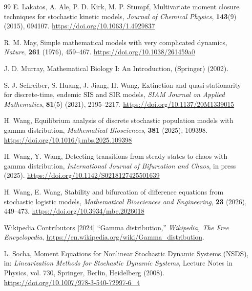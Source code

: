 \documentclass[12pt]{article}
\theoremstyle{definition}
\newcommand{\doilink}[1]{\href{#1}{#1}}
\begin{document}
\begin{thebibliography}{99}
\newblock E. Lakatos, A. Ale, P. D. Kirk, M. P. Stumpf,
\newblock Multivariate moment closure techniques for stochastic kinetic models,
\newblock \emph{Journal of Chemical Physics}, \textbf{143}(9) (2015), 094107.
\doilink{https://doi.org/10.1063/1.4929837}

\newblock R. M. May,
\newblock Simple mathematical models with very complicated dynamics,
\newblock \emph{Nature}, \textbf{261} (1976), 459--467.
\doilink{https://doi.org/10.1038/261459a0}

\newblock J. D. Murray,
\newblock Mathematical Biology I: An Introduction,
\newblock (Springer) (2002).

\newblock S. J. Schreiber, S. Huang, J. Jiang, H. Wang,
\newblock Extinction and quasi-stationarity for discrete-time, endemic SIS and SIR models,
\newblock \emph{SIAM Journal on Applied Mathematics}, \textbf{81}(5) (2021), 2195--2217.
\doilink{https://doi.org/10.1137/20M1339015}

\newblock H. Wang,
\newblock Equilibrium analysis of discrete stochastic population models with gamma distribution,
\newblock \emph{Mathematical Biosciences}, \textbf{381} (2025), 109398.
\doilink{https://doi.org/10.1016/j.mbs.2025.109398}

\newblock H. Wang, Y. Wang,
\newblock Detecting transitions from steady states to chaos with gamma distribution,
\newblock \emph{International Journal of Bifurcation and Chaos}, in press (2025).
\doilink{https://doi.org/10.1142/S0218127425501639}

\newblock H. Wang, E. Wang,
\newblock Stability and bifurcation of difference equations from stochastic logistic models,
\emph{Mathematical Biosciences and Engineering}, \textbf{23} (2026), 449--473.
\doilink{https://doi.org/10.3934/mbe.2026018}


Wikipedia Contributors [2024]
``Gamma distribution,'' {\it Wikipedia, The Free Encyclopedia}, 
\url{https://en.wikipedia.org/wiki/Gamma_distribution}.

\newblock L. Socha,
\newblock Moment Equations for Nonlinear Stochastic Dynamic Systems (NSDS),
in: \emph{Linearization Methods for Stochastic Dynamic Systems},
Lecture Notes in Physics, vol. 730, Springer, Berlin, Heidelberg (2008).
\url{https://doi.org/10.1007/978-3-540-72997-6_4}


\end{thebibliography}
\end{document}
